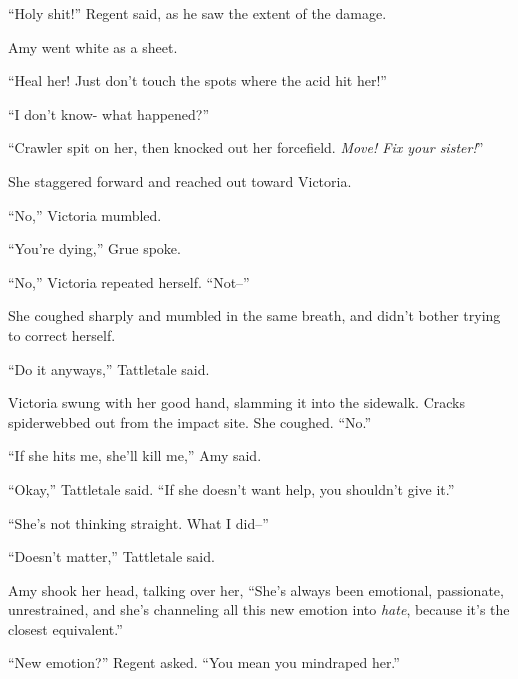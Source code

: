 ``Holy shit!''  Regent said, as he saw the extent of the damage.



Amy went white as a sheet.



``Heal her!  Just don't touch the spots where the acid hit her!''



``I don't know- what happened?''



``Crawler spit on her, then knocked out her forcefield.  \emph{Move!  Fix your sister!}''



She staggered forward and reached out toward Victoria.



``No,'' Victoria mumbled.



``You're dying,'' Grue spoke.



``No,'' Victoria repeated herself.  ``Not--''



She coughed sharply and mumbled in the same breath, and didn't bother trying to correct herself.



``Do it anyways,'' Tattletale said.



Victoria swung with her good hand, slamming it into the sidewalk.  Cracks spiderwebbed out from the impact site.  She coughed.  ``No.''



``If she hits me, she'll kill me,'' Amy said.



``Okay,'' Tattletale said.  ``If she doesn't want help, you shouldn't give it.''



``She's not thinking straight.  What I did--''



``Doesn't matter,'' Tattletale said.



Amy shook her head, talking over her, ``She's always been emotional, passionate, unrestrained, and she's channeling all this new emotion into \emph{hate}, because it's the closest equivalent.''



``New emotion?'' Regent asked.  ``You mean you mindraped her.''



